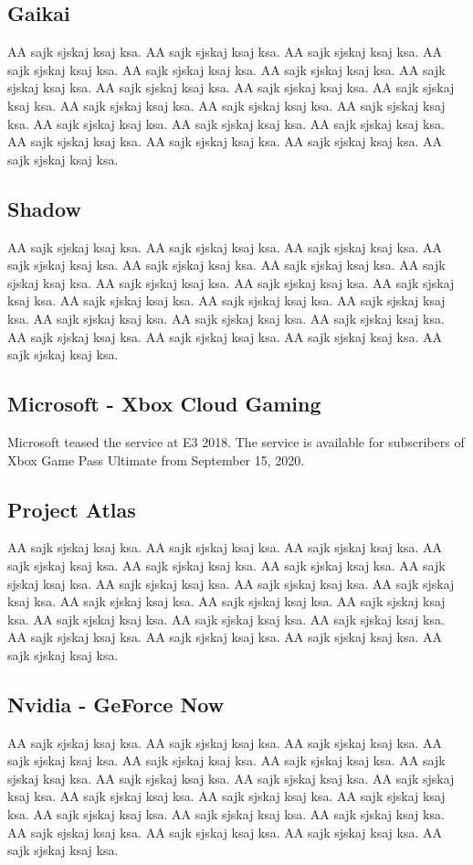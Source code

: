 \subsection{Gaikai}
AA sajk sjskaj ksaj ksa. AA sajk sjskaj ksaj ksa. AA sajk sjskaj ksaj ksa. AA sajk sjskaj ksaj ksa. AA sajk sjskaj ksaj ksa. AA sajk sjskaj ksaj ksa. AA sajk sjskaj ksaj ksa. AA sajk sjskaj ksaj ksa. AA sajk sjskaj ksaj ksa. AA sajk sjskaj ksaj ksa. AA sajk sjskaj ksaj ksa. AA sajk sjskaj ksaj ksa. AA sajk sjskaj ksaj ksa. AA sajk sjskaj ksaj ksa. AA sajk sjskaj ksaj ksa. AA sajk sjskaj ksaj ksa. AA sajk sjskaj ksaj ksa. AA sajk sjskaj ksaj ksa. AA sajk sjskaj ksaj ksa. AA sajk sjskaj ksaj ksa\cite{Xbox_Game_Pass_cloud_gaming}.
\subsection{Shadow}
AA sajk sjskaj ksaj ksa. AA sajk sjskaj ksaj ksa. AA sajk sjskaj ksaj ksa. AA sajk sjskaj ksaj ksa. AA sajk sjskaj ksaj ksa. AA sajk sjskaj ksaj ksa. AA sajk sjskaj ksaj ksa. AA sajk sjskaj ksaj ksa. AA sajk sjskaj ksaj ksa. AA sajk sjskaj ksaj ksa. AA sajk sjskaj ksaj ksa. AA sajk sjskaj ksaj ksa. AA sajk sjskaj ksaj ksa. AA sajk sjskaj ksaj ksa. AA sajk sjskaj ksaj ksa. AA sajk sjskaj ksaj ksa. AA sajk sjskaj ksaj ksa. AA sajk sjskaj ksaj ksa. AA sajk sjskaj ksaj ksa. AA sajk sjskaj ksaj ksa\cite{Xbox_Game_Pass_cloud_gaming}.
\subsection{Microsoft - Xbox Cloud Gaming}
Microsoft teased the service at E3 2018. The service is available for subscribers of Xbox Game Pass Ultimate from September 15, 2020\cite{Xbox_Game_Pass_cloud_gaming}.
\subsection{Project Atlas}
AA sajk sjskaj ksaj ksa. AA sajk sjskaj ksaj ksa. AA sajk sjskaj ksaj ksa. AA sajk sjskaj ksaj ksa. AA sajk sjskaj ksaj ksa. AA sajk sjskaj ksaj ksa. AA sajk sjskaj ksaj ksa. AA sajk sjskaj ksaj ksa. AA sajk sjskaj ksaj ksa. AA sajk sjskaj ksaj ksa. AA sajk sjskaj ksaj ksa. AA sajk sjskaj ksaj ksa. AA sajk sjskaj ksaj ksa. AA sajk sjskaj ksaj ksa. AA sajk sjskaj ksaj ksa. AA sajk sjskaj ksaj ksa. AA sajk sjskaj ksaj ksa. AA sajk sjskaj ksaj ksa. AA sajk sjskaj ksaj ksa. AA sajk sjskaj ksaj ksa\cite{Xbox_Game_Pass_cloud_gaming}.
\subsection{Nvidia - GeForce Now}
AA sajk sjskaj ksaj ksa. AA sajk sjskaj ksaj ksa. AA sajk sjskaj ksaj ksa. AA sajk sjskaj ksaj ksa. AA sajk sjskaj ksaj ksa. AA sajk sjskaj ksaj ksa. AA sajk sjskaj ksaj ksa. AA sajk sjskaj ksaj ksa. AA sajk sjskaj ksaj ksa. AA sajk sjskaj ksaj ksa. AA sajk sjskaj ksaj ksa. AA sajk sjskaj ksaj ksa. AA sajk sjskaj ksaj ksa. AA sajk sjskaj ksaj ksa. AA sajk sjskaj ksaj ksa. AA sajk sjskaj ksaj ksa. AA sajk sjskaj ksaj ksa. AA sajk sjskaj ksaj ksa. AA sajk sjskaj ksaj ksa. AA sajk sjskaj ksaj ksa\cite{GeForce_Now}.
